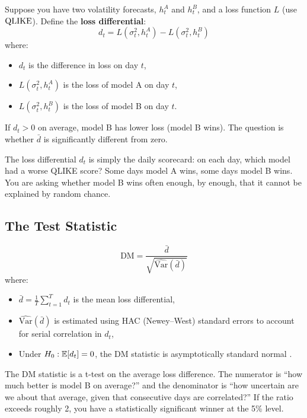 Suppose you have two volatility forecasts, $h^A_t$ and $h^B_t$, and a loss function $L$ (use $\operatorname{QLIKE}$).
Define the \textbf{loss differential}:
\begin{equation}
\label{eq:dm-diff}
d_t = L(\sigma^2_t, h^A_t) - L(\sigma^2_t, h^B_t)
\end{equation}
where:
\begin{itemize}[nosep]
  \item $d_t$ is the difference in loss on day $t$,
  \item $L(\sigma^2_t, h^A_t)$ is the loss of model A on day $t$,
  \item $L(\sigma^2_t, h^B_t)$ is the loss of model B on day $t$.
\end{itemize}

If $d_t > 0$ on average, model B has lower loss (model B wins).
The question is whether $\bar{d}$ is significantly different from zero.

\begin{intuition}
The loss differential $d_t$ is simply the daily scorecard: on each day, which model had a worse QLIKE score?
Some days model A wins, some days model B wins.
You are asking whether model B wins often enough, by enough, that it cannot be explained by random chance.
\end{intuition}

\subsection{The Test Statistic}

\begin{equation}
\label{eq:dm-stat}
\text{DM} = \frac{\bar{d}}{\sqrt{\widehat{\text{Var}}(\bar{d})}}
\end{equation}
where:
\begin{itemize}[nosep]
  \item $\bar{d} = \frac{1}{T}\sum_{t=1}^T d_t$ is the mean loss differential,
  \item $\widehat{\text{Var}}(\bar{d})$ is estimated using HAC (Newey--West) standard errors to account for serial correlation in $d_t$,
  \item Under $H_0: \mathbb{E}[d_t] = 0$, the DM statistic is asymptotically standard normal \citep{DieboldMariano1995}.
\end{itemize}

\begin{intuition}
The DM statistic is a t-test on the average loss difference.
The numerator is ``how much better is model B on average?'' and the denominator is ``how uncertain are we about that average, given that consecutive days are correlated?''
If the ratio exceeds roughly 2, you have a statistically significant winner at the 5\% level.
\end{intuition}

